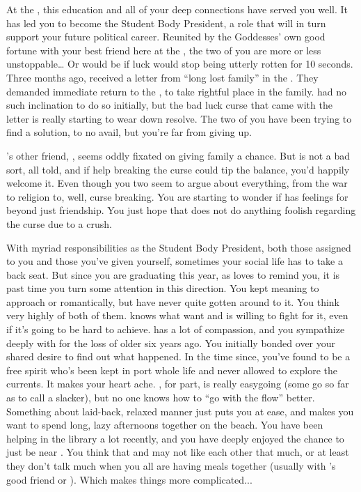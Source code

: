 \documentclass[char]{GL2020}
\begin{document}
At the \pSchool{}, this education and all of your deep connections have served you well. It has led you to become the Student Body President, a role that will in turn support your future political career. Reunited by the Goddesses' own good fortune with your best friend here at the \pSchool{}, the two of you are more or less unstoppable\ldots{} Or would be if \cInitiate{\their} luck would stop being utterly rotten for 10 seconds. Three months ago, \cInitiate{} received a letter from ``long lost family'' in the \pFarm{}. They demanded \cInitiate{\their} immediate return to the \pFarm{}, to take \cInitiate{\their} rightful place in the family. \cInitiate{} had no such inclination to do so initially, but the bad luck curse that came with the letter is really starting to wear down \cInitiate{\their} resolve. The two of you have been trying to find a solution, to no avail, but you're far from giving up. 

\cInitiate{}'s other friend, \cWarlordDaughter{\full}, seems oddly fixated on \cInitiate{} giving \cInitiate{\their} \pFarm{} family a chance. But \cWarlordDaughter{} is not a bad sort, all told, and if \cWarlordDaughter{\their} help breaking the curse could tip the balance, you'd happily welcome it. Even though you two seem to argue about everything, from the war to religion to, well, curse breaking. You are starting to wonder if \cInitiate{} has feelings for \cWarlordDaughter{} beyond just friendship. You just hope that \cInitiate{} does not do anything foolish regarding the curse due to a crush. 

With myriad responsibilities as the Student Body President, both those assigned to you and those you’ve given yourself, sometimes your social life has to take a back seat. But since you are graduating this year, as \cInitiate{} loves to remind you, it is past time you turn some attention in this direction. You kept meaning to approach \cHeir{\full} or \cChupStudent{\full} romantically, but have never quite gotten around to it. You think very highly of both of them. \cHeir{} knows what \cHeir{\they} want\cHeir{\verbs} and is willing to fight for it, even if it's going to be hard to achieve. \cHeir{} has a lot of compassion, and you sympathize deeply with \cHeir{\them} for the loss of \cHeir{\their} older \cHeirSibling{\sibling} six years ago. You initially bonded over your shared desire to find out what happened. In the time since, you’ve found \cHeir{} to be a free spirit who’s been kept in port \cHeir{\their} whole life and never allowed to explore the currents. It makes your heart ache. \cChupStudent{}, for \cChupStudent{\their} part, is really easygoing (some go so far as to call \cChupStudent{\them} a slacker), but no one knows how to ``go with the flow'' better. Something about \cChupStudent{\their} laid-back, relaxed manner just puts you at ease, and makes you want to spend long, lazy afternoons together on the beach. You have been helping \cChupStudent{} in the library a lot recently, and you have deeply enjoyed the chance to just be near \cChupStudent{\them}. You think that \cHeir{} and \cChupStudent{} may not like each other that much, or at least they don’t talk much when you all are having meals together (usually with \cHeir{}’s good friend \cAmbition{\full} or \cInitiate{}). Which makes things more complicated...
\end{document}
